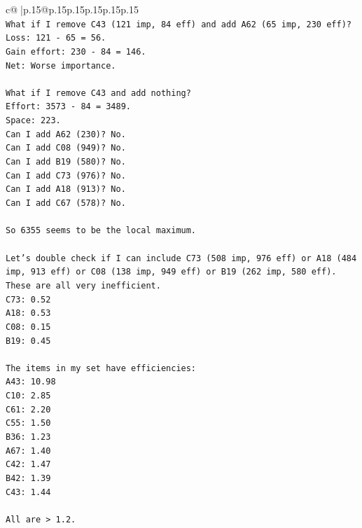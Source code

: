 \documentclass{article}
\begin{document}
{\begin{supertabular}{c@{$\;$}|p{.15\linewidth}@{}p{.15\linewidth}p{.15\linewidth}p{.15\linewidth}p{.15\linewidth}p{.15\linewidth}}
{{{\\ 
\texttt{What if I remove C43 (121 imp, 84 eff) and add A62 (65 imp, 230 eff)?} \\
\texttt{Loss: 121 {-} 65 = 56.} \\
\texttt{Gain effort: 230 {-} 84 = 146.} \\
\texttt{Net: Worse importance.} \\
\\ 
\texttt{What if I remove C43 and add nothing?} \\
\texttt{Effort: 3573 {-} 84 = 3489.} \\
\texttt{Space: 223.} \\
\texttt{Can I add A62 (230)? No.} \\
\texttt{Can I add C08 (949)? No.} \\
\texttt{Can I add B19 (580)? No.} \\
\texttt{Can I add C73 (976)? No.} \\
\texttt{Can I add A18 (913)? No.} \\
\texttt{Can I add C67 (578)? No.} \\
\\ 
\texttt{So 6355 seems to be the local maximum.} \\
\\ 
\texttt{Let's double check if I can include C73 (508 imp, 976 eff) or A18 (484 imp, 913 eff) or C08 (138 imp, 949 eff) or B19 (262 imp, 580 eff).} \\
\texttt{These are all very inefficient.} \\
\texttt{C73: 0.52} \\
\texttt{A18: 0.53} \\
\texttt{C08: 0.15} \\
\texttt{B19: 0.45} \\
\\ 
\texttt{The items in my set have efficiencies:} \\
\texttt{A43: 10.98} \\
\texttt{C10: 2.85} \\
\texttt{C61: 2.20} \\
\texttt{C55: 1.50} \\
\texttt{B36: 1.23} \\
\texttt{A67: 1.40} \\
\texttt{C42: 1.47} \\
\texttt{B42: 1.39} \\
\texttt{C43: 1.44} \\
\\ 
\texttt{All are > 1.2.} \\
}}}
\end{supertabular}}
\end{document}
